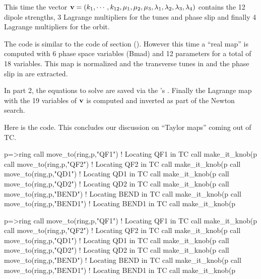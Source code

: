 \documentclass{hitec}     %
\begin{document}
{{This time the  vector ${\bf v}=(k_1,\cdots ,k_{12},{\mu }_{1},{\mu }_{2},{\mu }_{3},{\lambda }_{1},{\lambda }_{2},{\lambda }_{3},{\lambda }_{4})$ contains the 12 dipole strengths,  3 Lagrange multipliers for the tunes and phase slip and finally 4 Lagrange multipliers for the orbit.  

The code  is similar to the code of section (). However this time a ``real map'' is computed  with 6 phase space variables (Bmad) and 12 parameters for a total of 18 variables. This map is normalized and the transverse tunes in  and the phase slip in  are extracted.

In part 2, the equations to solve are saved via the 's . Finally the Lagrange map with the 19 variables of ${\bf v}$ is computed and inverted as part of the Newton search.

Here is the code. This concludes our discussion on ``Taylor maps'' coming out of TC.

\renewcommand{\codefont}{\scriptsize}
\begin{code}
p=>ring%
call move_to(ring,p,"QF1")   !  Locating QF1 in TC
call make_it_knob(p%
call move_to(ring,p,"QF2")   ! Locating QF2 in TC
call make_it_knob(p%
call move_to(ring,p,"QD1")     !  Locating QD1 in TC
call make_it_knob(p%
call move_to(ring,p,"QD2")     !  Locating QD2 in TC
call make_it_knob(p%
call move_to(ring,p,"BEND")     !  Locating BEND in TC
call make_it_knob(p%
call move_to(ring,p,"BEND1")    !  Locating BEND1 in TC
call make_it_knob(p%

p=>ring%
call move_to(ring,p,"QF1")   !  Locating QF1 in TC
call make_it_knob(p%
call move_to(ring,p,"QF2")   ! Locating QF2 in TC
call make_it_knob(p%
call move_to(ring,p,"QD1")     !  Locating QD1 in TC
call make_it_knob(p%
call move_to(ring,p,"QD2")     !  Locating QD2 in TC
call make_it_knob(p%
call move_to(ring,p,"BEND")     !  Locating BEND in TC
call make_it_knob(p%
call move_to(ring,p,"BEND1")    !  Locating BEND1 in TC
call make_it_knob(p%



\end{code}}}
\end{document}
